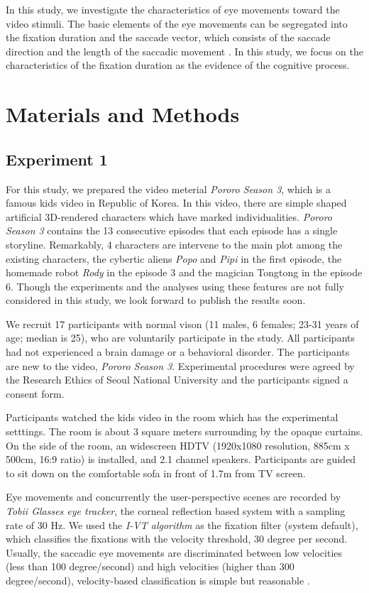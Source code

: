 \documentclass[10pt,letterpaper]{article}
\begin{document}
In this study, we investigate the characteristics of eye movements toward the video stimuli. The basic elements of the eye movements can be segregated into the fixation duration and the saccade vector, which consists of the saccade direction and the length of the saccadic movement \cite{Findlay1999,Feng2006}. In this study, we focus on the characteristics of the fixation duration as the evidence of the cognitive process.

\section{Materials and Methods}

\subsection{Experiment 1}

For this study, we prepared the video meterial \textit{Pororo Season 3}, which is a famous kids video in Republic of Korea. In this video, there are simple shaped artificial 3D-rendered characters which have marked individualities. \textit{Pororo Season 3} contains the 13 consecutive episodes that each episode has a single storyline. Remarkably, 4 characters are intervene to the main plot among the existing characters, the cybertic aliens \textit{Popo} and \textit{Pipi} in the first episode, the homemade robot \textit{Rody} in the episode 3 and the magician Tongtong in the episode 6. Though the experiments and the analyses using these features are not fully considered in this study, we look forward to publish the results soon. 

We recruit 17 participants with normal vison (11 males, 6 females; 23-31 years of age; median is 25), who are voluntarily participate in the study. All participants had not experienced a brain damage or a behavioral disorder. The participants are new to the video, \textit{Pororo Season 3}. Experimental procedures were agreed by the Research Ethics of Seoul National University and the participants signed a consent form.

Participants watched the kids video in the room which has the experimental setttings. The room is about 3 square meters surrounding by the opaque curtains. On the side of the room, an widescreen HDTV (1920x1080 resolution, 885cm x 500cm, 16:9 ratio) is installed, and 2.1 channel speakers. Participants are guided to sit down on the comfortable sofa in front of 1.7m from TV screen.

Eye movements and concurrently the user-perspective scenes are recorded by \textit{Tobii Glasses eye tracker}, the corneal reflection based system with a sampling rate of 30 Hz. We used the \textit{I-VT algorithm} as the fixation filter (system default), which classifies the fixations with the velocity threshold, 30 degree per second. Usually, the saccadic eye movements are discriminated between low velocities (less than 100 degree/second) and high velocities (higher than 300 degree/second), velocity-based classification is simple but reasonable \cite{Salvucci2000}.
\end{document}

